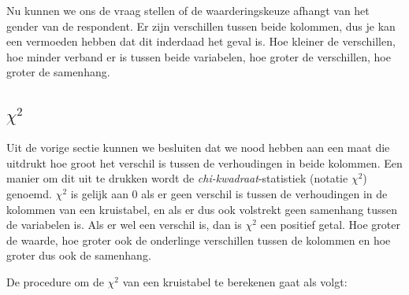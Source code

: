 Nu kunnen we ons de vraag stellen of de waarderingskeuze afhangt van het gender van de respondent. Er zijn verschillen tussen beide kolommen, dus je kan een vermoeden hebben dat dit inderdaad het geval is. Hoe kleiner de verschillen, hoe minder verband er is tussen beide variabelen, hoe groter de verschillen, hoe groter de samenhang.

\subsection{\texorpdfstring{$\chi^{2}$}{chi-kwadraat}}
\label{ssec:chi-kwadraat}

Uit de vorige sectie kunnen we besluiten dat we nood hebben aan een maat die uitdrukt hoe groot het verschil is tussen de verhoudingen in beide kolommen. Een manier om dit uit te drukken wordt de \emph{chi-kwadraat}-statistiek (notatie $\chi^{2}$) genoemd. $\chi^2$ is gelijk aan 0 als er geen verschil is tussen de verhoudingen in de kolommen van een kruistabel, en als er dus ook volstrekt geen samenhang tussen de variabelen is. Als er wel een verschil is, dan is $\chi^2$ een positief getal. Hoe groter de waarde, hoe groter ook de onderlinge verschillen tussen de kolommen en hoe groter dus ook de samenhang.

De procedure om de $\chi^2$ van een kruistabel te berekenen gaat als volgt:

